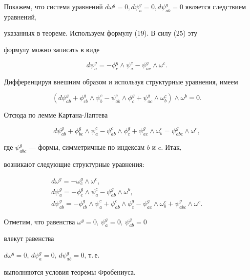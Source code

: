 \begin{pf} Покажем, что система уравнений $d\omega^g = 0,


d\psi^g_a = 0, d\psi^g_{ab} = 0$ является следствием уравнений,


указанных в теореме. Используем формулу (19). В силу (25) эту


формулу можно записать в виде


$$


d\psi^g_a = - \phi^g_c \wedge \psi^c_a - \psi^g_{ac} \wedge \omega^c.


$$


Дифференцируя внешним образом и используя структурные уравнения, имеем


$$


(d\psi^g_{ab} + \phi^g_{cb} \wedge \psi^c_b -


\psi^c_{ab} \wedge \phi^g_c + \psi^g_{ac} \wedge \omega^c_b) \wedge


\omega^b = 0.


$$


Отсюда по лемме Картана-Лаптева


$$


d\psi^g_{ab} + \phi^g_{bc} \wedge \psi^c_a -


\psi^c_{ab} \wedge \phi^g_c + \psi^g_{ac} \wedge \omega^c_b =


\psi^g_{abc} \wedge \omega^c,


$$


где $\psi^g_{abc}$ --- формы, симметричные по индексам $b$ и $c$. Итак,


возникают следующие структурные уравнения:


\begin{gather*}


d\omega^g = -\omega^g_c \wedge \omega^c, \\


d\psi^g_a = -\phi^g_c \wedge \psi^c_a - \psi^g_{ab} \wedge \omega^b, \\


d\psi^g_{ab} = -\phi^g_{cb} \wedge \psi^c_a +


\psi^c_{ab} \wedge \phi^g_c - \psi^g_{ac} \wedge \omega^c_b +


\psi^g_{abc} \wedge \omega^c.


\end{gather*}


Отметим, что равенства $\omega^g = 0$, $\psi^g_a = 0$, $\psi^g_{ab} = 0$


влекут равенства


$d\omega^g = 0$, $d\psi^g_a = 0$, $d\psi^g_{ab} = 0$, т.\,е.


выполняются условия теоремы Фробениуса.


\end{pf}





